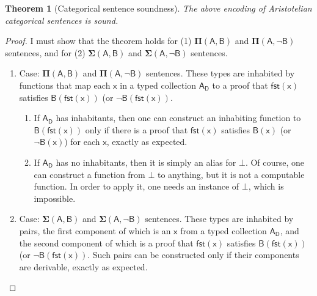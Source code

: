 \documentclass{article}
\newtheorem{theorem}{Theorem}
\newcommand\e{\mathsf}
\def\Empty/{\e{\bot}}
\def\x/{\e{x}}
\def\Domain/{\e{D}}
\newcommand\Dep[2]{\e{#1(#2)}}
\newcommand\First[1]{\e{fst(#1)}}
\newcommand\Gen[2]{\e{#1_{#2}}}
\newcommand\PI[2]{\mathbf{\Pi}\e{(#1, #2)}}
\newcommand\SIG[2]{\mathbf{\Sigma}\e{(#1, #2)}}
\begin{document}
\begin{theorem}[Categorical sentence soundness]
  \label{theorem:soundness}
  The above encoding of Aristotelian categorical sentences is sound.
\end{theorem}

\begin{proof}
  I must show that the theorem holds for (1) $\PI{A}{B}$ and $\PI{A}{\lnot B}$ sentences, and for (2) $\SIG{A}{B}$ and $\SIG{A}{\lnot B}$ sentences.
  
  \begin{enumerate}
  
    \item Case: $\PI{A}{B}$ and $\PI{A}{\lnot B}$ sentences. These types are inhabited by functions that map each $\x/$ in a typed collection $\Gen{A}{\Domain/}$ to a proof that $\First{x}$ satisfies $\Dep{B}{\First{x}}$ (or $\lnot \Dep{B}{\First{x}}$.
  
      \begin{enumerate} 
      
        \item If $\Gen{A}{\Domain/}$ has inhabitants, then one can construct an inhabiting function to $\Dep{B}{\First{x}}$ only if there is a proof that $\First{x}$ satisfies $\Dep{B}{x}$ (or $\lnot \Dep{B}{x}$) for each $\x/$, exactly as expected.
    
        \item If $\Gen{A}{\Domain/}$ has no inhabitants, then it is simply an alias for $\Empty/$. Of course, one can construct a function from $\Empty/$ to anything, but it is not a computable function. In order to apply it, one needs an instance of $\Empty/$, which is impossible.

      \end{enumerate}
  
    \item Case: $\SIG{A}{B}$ and $\SIG{A}{\lnot B}$ sentences. These types are inhabited by pairs, the first component of which is an $\x/$ from a typed collection $\Gen{A}{\Domain/}$, and the second component of which is a proof that $\First{x}$ satisfies $\Dep{B}{\First{x}}$ (or $\lnot \Dep{B}{\First{x}}$. Such pairs can be constructed only if their components are derivable, exactly as expected.
    
  \end{enumerate}
  
\end{proof}


\end{document}
